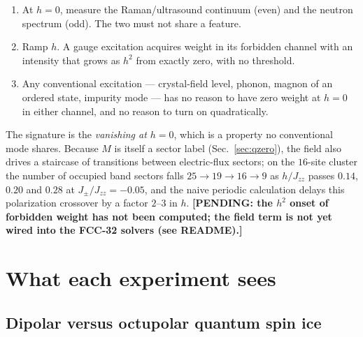 \documentclass[aps,prl,preprint,amsmath,amssymb,superscriptaddress,
longbibliography,floatfix]{revtex4-2}
\newcommand{\Jzz}{J_{zz}}
\newcommand{\Jpm}{J_{\pm}}
\newcommand{\pending}[1]{{\color{red}\textbf{[PENDING: #1]}}}
\begin{document}
\begin{enumerate}
\item At $h=0$, measure the Raman/ultrasound continuum (even) and the neutron
spectrum (odd).  The two must not share a feature.
\item Ramp $h$.  A gauge excitation acquires weight in its forbidden channel
with an intensity that grows as $h^2$ from exactly zero, with no threshold.
\item Any conventional excitation --- crystal-field level, phonon, magnon of an
ordered state, impurity mode --- has no reason to have zero weight at $h=0$ in
either channel, and no reason to turn on quadratically.
\end{enumerate}
The signature is the \emph{vanishing at $h=0$}, which is a property no
conventional mode shares.  Because $M$ is itself a sector label
(Sec.~\ref{sec:qzero}), the field also drives a staircase of transitions
between electric-flux sectors; on the $16$-site cluster the number of occupied
band sectors falls $25\to19\to16\to9$ as $h/\Jzz$ passes
$0.14$, $0.20$ and $0.28$ at $\Jpm/\Jzz=-0.05$, and the naive periodic
calculation delays this polarization crossover by a factor $2$--$3$ in $h$.
\pending{the $h^2$ onset of forbidden weight has not been computed; the field
term is not yet wired into the FCC-32 solvers (see README).}

\section{What each experiment sees}
\label{sec:experiment}

\subsection{Dipolar versus octupolar quantum spin ice}
\end{document}
